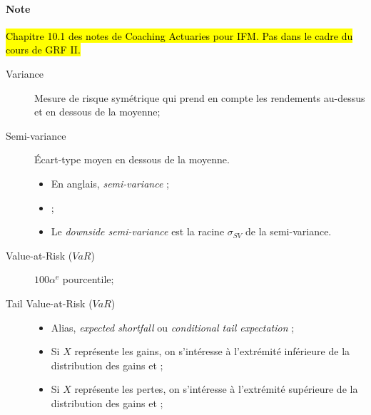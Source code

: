 \documentclass[10pt, french]{article}
\begin{document}
\begin{multicols*}{2}
\paragraph{Note}	\hl{Chapitre 10.1 des notes de Coaching Actuaries pour IFM. Pas dans le cadre du cours de GRF II.}
\begin{description}
	\item[Variance]	Mesure de risque symétrique qui prend en compte les rendements au-dessus et en dessous de la moyenne;
	\item[Semi-variance]	Écart-type moyen en dessous de la moyenne.
		\begin{itemize}[leftmargin = *]
		\item	En anglais, \og \textit{semi-variance} \fg{};
		\item	{};
		\item	Le \og \textit{downside semi-variance} \fg{} est la racine $\sigma_{SV}$ de la semi-variance.
		\end{itemize}
	\item[Value-at-Risk ($VaR$)]	$100\alpha^{\text{e}}$ pourcentile;
	\item[Tail Value-at-Risk ($VaR$)]	
		\begin{itemize}[leftmargin = *]
		\item	Alias, \og \textit{expected shortfall} \fg{} ou \og \textit{conditional tail expectation} \fg{};
		\item	Si $X$ représente les gains, on s'intéresse à l'extrémité inférieure de la distribution des gains et ;
		\item	Si $X$ représente les pertes, on s'intéresse à l'extrémité supérieure de la distribution des gains et ;
		\end{itemize}
\end{description}


\end{multicols*}
\end{document}
